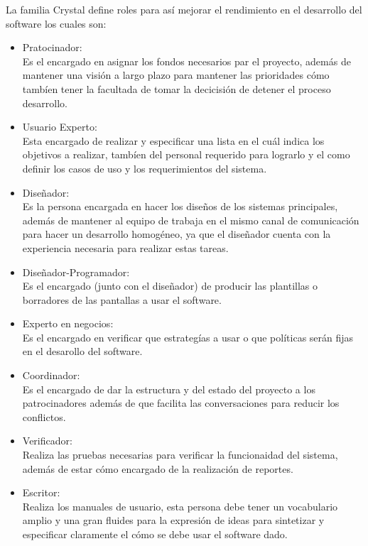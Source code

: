 \documentclass[12pt,a4paper]{article}
\begin{document}
	La familia Crystal define roles para as\'i mejorar el rendimiento en el desarrollo del software los cuales son:
	\begin{itemize}
		\item Pratocinador:\\
		Es el encargado en asignar los fondos necesarios par el proyecto, además de mantener una visi\'on a largo plazo para mantener las prioridades c\'omo tamb\'ien tener la facultada de tomar la decicisi\'on de detener el proceso desarrollo.
		\item Usuario Experto:\\
		Esta encargado de realizar y especificar una lista en el cu\'al indica los objetivos a realizar, tamb\'ien del personal requerido para lograrlo y el como definir los casos de uso y los requerimientos del sistema. 
		\item Diseñador:\\
		Es la persona encargada en hacer los diseños de los sistemas principales, además de mantener al equipo de trabaja en el mismo canal de comunicación para hacer un desarrollo homog\'eneo, ya que el diseñador cuenta con la experiencia necesaria para realizar estas tareas.
		\item Diseñador-Programador:\\
		Es el encargado (junto con el diseñador) de producir las plantillas o borradores de las pantallas a usar el software.
		\item Experto en negocios:\\
		Es el encargado en verificar que estrateg\'ias a usar o que pol\'iticas ser\'an fijas en el desarollo del software.
		\item Coordinador:\\
		Es el encargado de dar la estructura y del estado del proyecto a los patrocinadores además de que facilita las conversaciones para reducir los conflictos.
		\item Verificador:\\
		Realiza las pruebas necesarias para verificar la funcionaidad del sistema, además de estar c\'omo encargado de la realizaci\'on de reportes.
		\item Escritor:\\
		Realiza los manuales de usuario, esta persona debe tener un vocabulario amplio y una gran fluides para la expresi\'on de ideas para sintetizar y especificar claramente el c\'omo se debe usar el software dado.      
	\end{itemize}
	
	 
	
\end{document}

